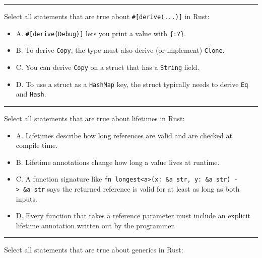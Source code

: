 \documentclass[
  11pt,
]{article}
\providecommand{\tightlist}{%
  \setlength{\itemsep}{0pt}\setlength{\parskip}{0pt}}
\begin{document}
\begin{center}\rule{0.5\linewidth}{0.5pt}\end{center}

Select all statements that are true about \texttt{\#{[}derive(...){]}}
in Rust:

\begin{itemize}
\tightlist
\item[$\square$]
  A. \texttt{\#{[}derive(Debug){]}} lets you print a value with
  \texttt{\{:?\}}.
\item[$\square$]
  B. To derive \texttt{Copy}, the type must also derive (or implement)
  \texttt{Clone}.
\item[$\square$]
  C. You can derive \texttt{Copy} on a struct that has a \texttt{String}
  field.
\item[$\square$]
  D. To use a struct as a \texttt{HashMap} key, the struct typically
  needs to derive \texttt{Eq} and \texttt{Hash}.
\end{itemize}

\begin{center}\rule{0.5\linewidth}{0.5pt}\end{center}

Select all statements that are true about lifetimes in Rust:

\begin{itemize}
\tightlist
\item[$\square$]
  A. Lifetimes describe how long references are valid and are checked at
  compile time.
\item[$\square$]
  B. Lifetime annotations change how long a value lives at runtime.
\item[$\square$]
  C. A function signature like
  \texttt{fn\ longest\textless{}\textquotesingle{}a\textgreater{}(x:\ \&\textquotesingle{}a\ str,\ y:\ \&\textquotesingle{}a\ str)\ -\textgreater{}\ \&\textquotesingle{}a\ str}
  says the returned reference is valid for at least as long as both
  inputs.
\item[$\square$]
  D. Every function that takes a reference parameter must include an
  explicit lifetime annotation written out by the programmer.
\end{itemize}

\begin{center}\rule{0.5\linewidth}{0.5pt}\end{center}

Select all statements that are true about generics in Rust:
\end{document}
